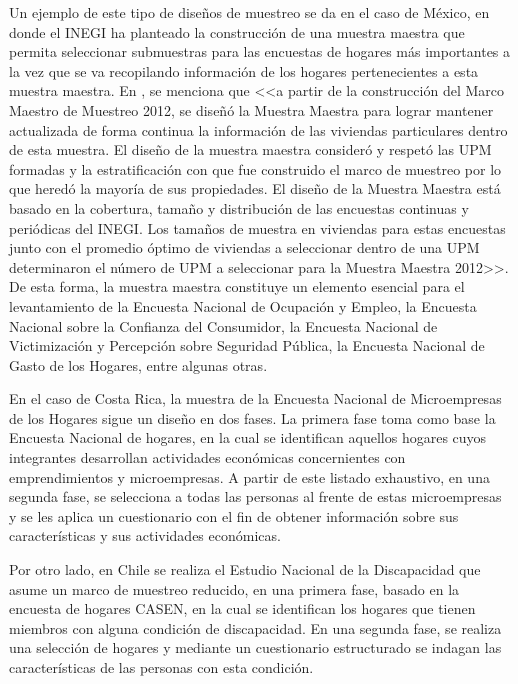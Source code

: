 \documentclass[
  12pt,
]{book}
\begin{document}
Un ejemplo de este tipo de diseños de muestreo se da en el caso de México, en donde el INEGI ha planteado la construcción de una muestra maestra que permita seleccionar submuestras para las encuestas de hogares más importantes a la vez que se va recopilando información de los hogares pertenecientes a esta muestra maestra. En \citet{INEGI_MX_2012}, se menciona que \textless\textless a partir de la construcción del Marco Maestro de Muestreo 2012, se diseñó la Muestra Maestra para lograr mantener actualizada de forma continua la información de las viviendas particulares dentro de esta muestra. El diseño de la muestra maestra consideró y respetó las UPM formadas y la estratificación con que fue construido el marco de muestreo por lo que heredó la mayoría de sus propiedades. El diseño de la Muestra Maestra está basado en la cobertura, tamaño y distribución de las encuestas continuas y periódicas del INEGI. Los tamaños de muestra en viviendas para estas encuestas junto con el promedio óptimo de viviendas a seleccionar dentro de una UPM determinaron el número de UPM a seleccionar para la Muestra Maestra 2012\textgreater\textgreater. De esta forma, la muestra maestra constituye un elemento esencial para el levantamiento de la Encuesta Nacional de Ocupación y Empleo, la Encuesta Nacional sobre la Confianza del Consumidor, la Encuesta Nacional de Victimización y Percepción sobre Seguridad Pública, la Encuesta Nacional de Gasto de los Hogares, entre algunas otras.

En el caso de Costa Rica, la muestra de la Encuesta Nacional de Microempresas de los Hogares sigue un diseño en dos fases. La primera fase toma como base la Encuesta Nacional de hogares, en la cual se identifican aquellos hogares cuyos integrantes desarrollan actividades económicas concernientes con emprendimientos y microempresas. A partir de este listado exhaustivo, en una segunda fase, se selecciona a todas las personas al frente de estas microempresas y se les aplica un cuestionario con el fin de obtener información sobre sus características y sus actividades económicas.

Por otro lado, en Chile se realiza el Estudio Nacional de la Discapacidad que asume un marco de muestreo reducido, en una primera fase, basado en la encuesta de hogares CASEN, en la cual se identifican los hogares que tienen miembros con alguna condición de discapacidad. En una segunda fase, se realiza una selección de hogares y mediante un cuestionario estructurado se indagan las características de las personas con esta condición.
\end{document}
